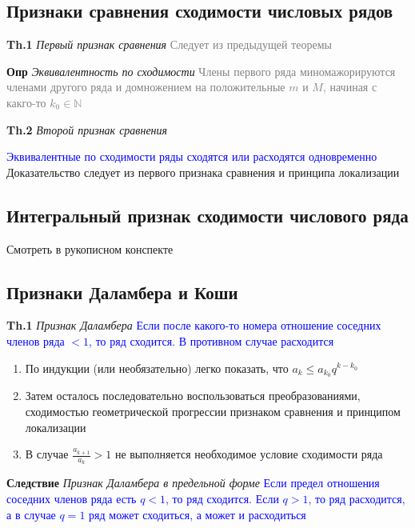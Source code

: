 \subsection{Признаки сравнения сходимости числовых рядов}

\textbf{Th.1} \textit{Первый признак сравнения} \textcolor{gray}{Следует из предыдущей теоремы}

\textbf{Опр} \textit{Эквивалентность по сходимости} \textcolor{gray}{Члены первого ряда миномажорируются членами
другого ряда и домножением на положительные $m$ и $M$, начиная с какго-то $k_0 \in \mathbb{N}$}

\textbf{Th.2} \textit{Второй признак сравнения}

\textcolor{blue}{Эквивалентные по сходимости ряды сходятся или
расходятся одновременно} \\

Доказательство следует из первого признака сравнения и принципа локализации

\subsection{Интегральный признак сходимости числового ряда}

Смотреть в рукописном конспекте

\subsection{Признаки Даламбера и Коши}

\textbf{Th.1} \textit{Признак Даламбера} \textcolor{blue}{Если после какого-то номера отношение соседних членов
ряда $< 1$, то ряд сходится. В противном случае расходится}

\begin{enumerate}
    \item По индукции (или необязательно) легко показать, что $a_k \leq a_{k_0} q^{k - k_0}$
    \item Затем осталось последовательно воспользоваться преобразованиями, сходимостью геометрической прогрессии
    признаком сравнения и принципом локализации
    \item В случае $\frac{a_{k+1}}{a_k} > 1$ не выполняется необходимое условие сходимости ряда
\end{enumerate}

\textbf{Следствие} \textit{Признак Даламбера в предельной форме} \textcolor{blue}{Если предел отношения соседних
членов ряда есть $q < 1$, то ряд сходится. Если $q > 1$, то ряд расходится, а в случае $q = 1$ ряд может
сходиться, а может и расходиться}

